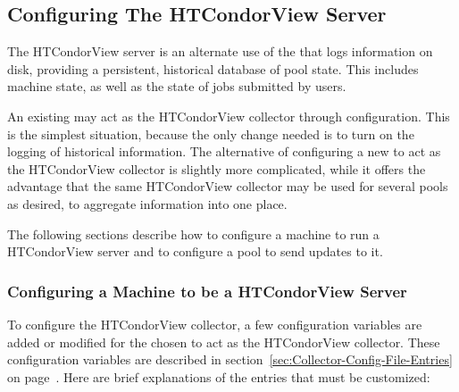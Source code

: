 \subsection{\label{sec:Contrib-HTCondorView-Install}
Configuring The HTCondorView Server}

The HTCondorView server is an alternate use of the
that logs information on disk, providing a 
persistent, historical database of pool state.
This includes machine state, as well as the state of jobs submitted by
users.

An existing  may act as the
HTCondorView collector through configuration.  
This is the simplest situation, because the only change
needed is to turn on the logging of historical information.
The alternative of configuring a new  to act as the
HTCondorView collector is slightly more complicated,
while it offers the
advantage that the same HTCondorView collector may be used
for several pools as desired, to aggregate information into one place.

The following sections describe how to configure a machine to run a
HTCondorView server and to configure a pool to send updates to it. 


\subsubsection{\label{sec:HTCondorView-Server-Setup}
Configuring a Machine to be a HTCondorView Server} 


To configure the HTCondorView collector, a few configuration variables
are added or modified
for the  chosen to act
as the HTCondorView collector.
These configuration variables are described in 
section~\ref{sec:Collector-Config-File-Entries} on
page~\pageref{sec:Collector-Config-File-Entries}.
Here are brief explanations of the entries that must be customized:

